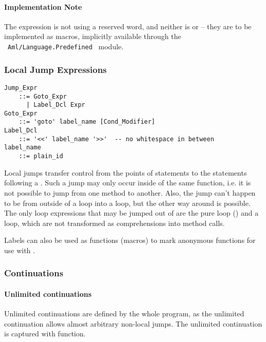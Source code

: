 \paragraph{Implementation Note}
The  expression is not using a reserved word, and neither is  or  -- they are to be implemented as macros, implicitly available through the ~\lstinline!Aml/Language.Predefined!~ module.






\subsubsection{Local Jump Expressions}
\label{sec:local-jump-expressions}

\grammar\begin{lstlisting}
Jump_Expr 
    ::= Goto_Expr 
      | Label_Dcl Expr
Goto_Expr 
    ::= 'goto' label_name [Cond_Modifier]
Label_Dcl
    ::= '<<' label_name '>>'  -- no whitespace in between
label_name 
    ::= plain_id
\end{lstlisting}

Local jumps transfer control from the points of  statements to the statements following a . Such a jump may only occur inside of the same function, i.e. it is not possible to jump from one method to another. Also, the jump can't happen to be from outside of a loop into a loop, but the other way around is possible. The only loop expressions that may be jumped out of are the pure loop () and a  loop, which are not transformed as comprehensions into method calls. 

Labels can also be used as functions (macros) to mark anonymous functions for use with .






\subsubsection{Continuations}
\label{sec:continuations}






\paragraph{Unlimited continuations}

Unlimited continuations are defined by the whole program, as the unlimited continuation allows almost arbitrary non-local jumps. The unlimited continuation is captured with  function. 

